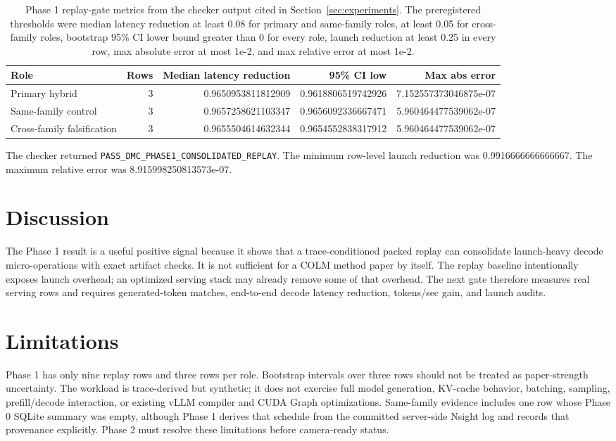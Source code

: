 \documentclass{article}
\begin{document}
\begin{table}[t]
\centering
\scriptsize
\begin{tabular}{lrrrr}
\toprule
Role & Rows & Median latency reduction & 95\% CI low & Max abs error \\
\midrule
Primary hybrid & 3 & 0.9650953811812909 & 0.9618806519742926 & 7.152557373046875e-07 \\
Same-family control & 3 & 0.9657258621103347 & 0.9656092336667471 & 5.960464477539062e-07 \\
Cross-family falsification & 3 & 0.9655504614632344 & 0.9654552838317912 & 5.960464477539062e-07 \\
\bottomrule
\end{tabular}
\caption{Phase 1 replay-gate metrics from the checker output cited in
Section~\ref{sec:experiments}.
The preregistered thresholds were median latency reduction at least 0.08 for
primary and same-family roles, at least 0.05 for cross-family roles, bootstrap
95\% CI lower bound greater than 0 for every role, launch reduction at least
0.25 in every row, max absolute error at most 1e-2, and max relative error at
most 1e-2.}
\end{table}

The checker returned
\texttt{PASS\_DMC\_PHASE1\_CONSOLIDATED\_REPLAY}. The minimum row-level launch
reduction was 0.9916666666666667. The maximum relative error was
8.915998250813573e-07.

\section{Discussion}

The Phase 1 result is a useful positive signal because it shows that a
trace-conditioned packed replay can consolidate launch-heavy decode
micro-operations with exact artifact checks. It is not sufficient for a COLM
method paper by itself. The replay baseline intentionally exposes launch
overhead; an optimized serving stack may already remove some of that overhead.
The next gate therefore measures real serving rows and requires generated-token
matches, end-to-end decode latency reduction, tokens/sec gain, and launch
audits.

\section{Limitations}

Phase 1 has only nine replay rows and three rows per role. Bootstrap intervals
over three rows should not be treated as paper-strength uncertainty. The
workload is trace-derived but synthetic; it does not exercise full model
generation, KV-cache behavior, batching, sampling, prefill/decode interaction,
or existing vLLM compiler and CUDA Graph optimizations. Same-family evidence
includes one row whose Phase 0 SQLite summary was empty, although Phase 1
derives that schedule from the committed server-side Nsight log and records
that provenance explicitly. Phase 2 must resolve these limitations before
camera-ready status.
\end{document}
